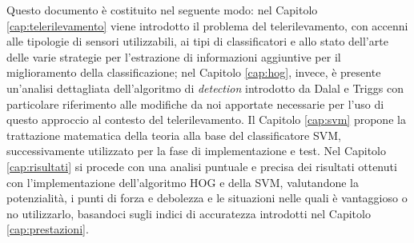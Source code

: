 Questo documento è costituito nel seguente modo: nel Capitolo \ref{cap:telerilevamento} viene introdotto il problema del telerilevamento, con accenni alle tipologie di sensori utilizzabili, ai tipi di classificatori e allo stato dell'arte delle varie strategie per l'estrazione di informazioni aggiuntive per il miglioramento della classificazione; nel Capitolo \ref{cap:hog}, invece, è presente un'analisi dettagliata dell'algoritmo di \emph{detection} introdotto da Dalal e Triggs \citep{Art_HOGHuman} con particolare riferimento alle modifiche da noi apportate necessarie per l'uso di questo approccio al contesto del telerilevamento. Il Capitolo \ref{cap:svm} propone la trattazione matematica della teoria alla base del classificatore SVM, successivamente utilizzato per la fase di implementazione e test. 
Nel Capitolo \ref{cap:risultati} si procede con una analisi puntuale e precisa dei risultati ottenuti con l'implementazione dell'algoritmo HOG e della SVM, valutandone la potenzialità, i punti di forza e debolezza e le situazioni nelle quali è vantaggioso o no utilizzarlo, basandoci sugli indici di accuratezza introdotti nel Capitolo \ref{cap:prestazioni}.